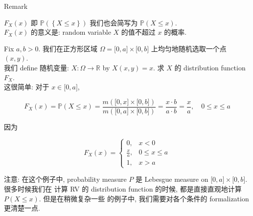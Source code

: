 \documentclass{qlnotes-export}
\begin{document}
\begin{qlremark}{Remark}

\(F_{X}(x)\) 即 \({\mathbb{P}}(\left\{ {X \leq x} \right\})\) 我们也会简写为 \({\mathbb{P}}(X \leq x)\).\\
\(F_{X}(x)\) 的意义是: random variable \(X\) 的值不超过 \(x\) 的概率.\\

\end{qlremark}

\begin{example}\label{ex-02-random-variables-geometric-probability}

Fix \(a,b > 0\). 我们在正方形区域 \(\Omega = \lbrack 0,a\rbrack \times \lbrack 0,b\rbrack\) 上均匀地随机选取一个点 \((x,y)\).\\
我们 define 随机变量: \(X:\Omega\rightarrow{\mathbb{R}}\) by \(X(x,y) = x\). 求 \(X\) 的 distribution function \(F_{X}\).\\
这很简单: 对于 \(x \in \lbrack 0,a\rbrack\),

\[F_{X}(x) = {\mathbb{P}}(X \leq x) = \frac{m(\lbrack 0,x\rbrack \times \lbrack 0,b\rbrack)}{m(\lbrack 0,a\rbrack \times \lbrack 0,b\rbrack)} = \frac{x \cdot b}{a \cdot b} = \frac{x}{a},\quad 0 \leq x \leq a\]

因为

\[F_{X}(x) = \left\{ \begin{matrix}
{0,} & {x < 0} \\
{\frac{x}{a},} & {0 \leq x \leq a} \\
{1,} & {x > a}
\end{matrix} \right.\]

注意: 在这个例子中, probability measure \(P\) 是 Lebesgue measure on \(\lbrack 0,a\rbrack \times \lbrack 0,b\rbrack\). 很多时候我们在 计算 RV 的 distribution function 的时候, 都是直接直观地计算 \(P(X \leq x)\). 但是在稍微复杂一些 的例子中, 我们需要对各个条件的 formalization 更清楚一点.

\end{example}
\end{document}
